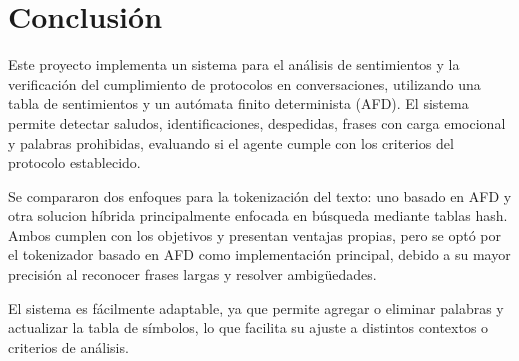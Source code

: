 \section{Conclusión} 
Este proyecto implementa un sistema para el análisis de sentimientos y la verificación del
cumplimiento de protocolos en conversaciones, utilizando una tabla de sentimientos y un
autómata finito determinista (AFD). El sistema permite detectar saludos, identificaciones,
despedidas, frases con carga emocional y palabras prohibidas, evaluando si el agente cumple con
los criterios del protocolo establecido.

Se compararon dos enfoques para la tokenización del texto: uno basado en AFD y otra solucion
híbrida principalmente enfocada en búsqueda mediante tablas hash. Ambos cumplen con los
objetivos y presentan ventajas propias, pero se optó por el tokenizador basado en AFD como
implementación principal, debido a su mayor precisión al reconocer frases largas y resolver
ambigüedades.

El sistema es fácilmente adaptable, ya que permite agregar o eliminar palabras y actualizar la
tabla de símbolos, lo que facilita su ajuste a distintos contextos o criterios de análisis.
